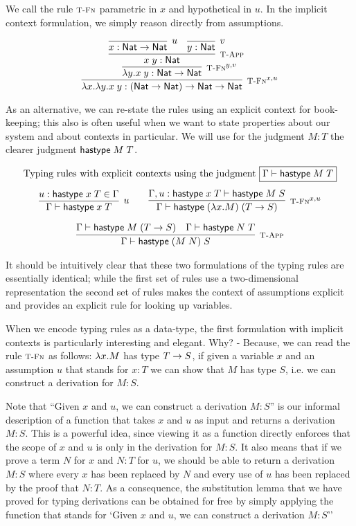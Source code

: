 We call the rule $\textsc{\footnotesize T-Fn}$ parametric in $x$ and hypothetical in $u$.
In the implicit context formulation, we simply reason directly from
assumptions.


\[
\infer[\TFn^{x,u}]{\lam x. \lam y. x \app y : (\Nat \arrow \Nat) \arrow \Nat \arrow \Nat}
{\infer[\TFn^{y,v}]{\lam y.x \app y : \Nat \arrow \Nat}{
 \infer[\TApp]{x \app y : \Nat}
   {\infer[u]{x:\Nat \arrow \Nat}{} &
    \infer[v]{y:\Nat}{}
   }
 }
}
\]

As an alternative, we can re-state the rules using an explicit context for
book-keeping; this also is often useful when we want to state properties about
our system and about contexts in particular. We will use for the judgment $M:T$
the clearer judgment $\textsf{hastype}\;M\;T$.



\[
\begin{array}{c}
\multicolumn{1}{l}{\mbox{Typing rules with explicit contexts using the judgment
    \fbox{$\Gamma \vdash \tmhastype M T$}}} \\[1em]
\infer[u]{\Gamma \vdash \tmhastype x T}{u:\tmhastype x T \in \Gamma} \qquad
\infer[\TFn^{x,u}]{\Gamma \vdash \tmhastype {(\lam x.M)} {(T \arrow S)}}
                 {\Gamma, u:\tmhastype x T \vdash \tmhastype M S}\\[1em]
\infer[\TApp]{\Gamma \vdash \tmhastype {(M \app N)} S}
             {\Gamma \vdash \tmhastype M (T \arrow S)
  & \Gamma \vdash \tmhastype N T}
\end{array}
\]

It should be intuitively clear that these two formulations of the typing rules
are essentially identical; while the first set of rules use a two-dimensional
representation the second set of rules makes the context of
assumptions explicit and provides an explicit rule for looking up variables.

When we encode typing rules as a data-type, the first formulation with implicit
contexts is particularly interesting and elegant. Why? - Because, we can read the
rule $\textsc{\footnotesize T-Fn}$ as follows: $\lambda x.M$ has type $T \rightarrow S$, if given a variable
$x$ and an assumption $u$ that stands for $x:T$ we can show that $M$ has type
$S$, i.e. we can construct a derivation for $M:S$.

Note that ``Given $x$ and $u$, we can construct a derivation $M:S$'' is our
informal description of a function that takes $x$ and $u$ as input and returns a
derivation $M:S$. This is a powerful idea, since viewing it as a function
directly enforces that the scope of $x$ and $u$ is only in the derivation for
$M:S$. It also means that if we prove a term $N$ for $x$ and $N:T$ for $u$, we
should be able to return a derivation $M:S$ where every $x$ has been replaced
by $N$ and every use of $u$ has been replaced by the proof that $N:T$. As a
consequence, the substitution lemma that we have proved for typing derivations
can be obtained for free by simply applying the function that stands for `Given
$x$ and $u$, we can construct a derivation $M:S$''


